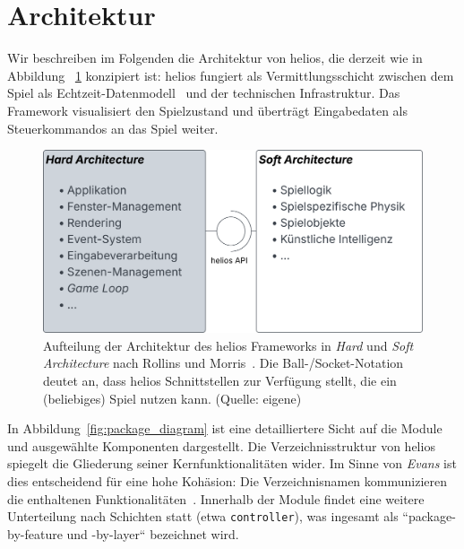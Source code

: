 \section{Architektur}
Wir beschreiben im Folgenden die Architektur von helios, die derzeit wie in Abbildung ~\ref{fig:hardarchitecture} konzipiert ist: helios fungiert als Vermittlungsschicht zwischen dem Spiel als Echtzeit-Datenmodell~\cite[525]{Gre19} und der technischen Infrastruktur.
Das Framework visualisiert den Spielzustand und überträgt Eingabedaten als Steuerkommandos an das Spiel weiter.

\begin{figure}[!h]
    \centering
    \includegraphics[width=1\columnwidth]{img/hardarchitecture.svg}
    \caption{Aufteilung der Architektur des helios Frameworks in \textit{Hard} und \textit{Soft Architecture} nach Rollins und Morris~\cite[612 ff.]{RM04}. Die Ball-/Socket-Notation deutet an, dass helios Schnittstellen zur Verfügung stellt, die ein (beliebiges) Spiel nutzen kann. (Quelle: eigene)}
    \label{fig:hardarchitecture}
\end{figure}

In Abbildung~\ref{fig:package_diagram} ist eine detailliertere Sicht auf die Module und ausgewählte Komponenten dargestellt.
Die Verzeichnisstruktur von helios spiegelt die Gliederung seiner Kernfunktionalitäten wider.
Im Sinne von \textit{Evans} ist dies entscheidend für eine hohe Kohäsion: Die Verzeichnisnamen kommunizieren die enthaltenen Funktionalitäten~\cite[180 f.]{Eva03}.
Innerhalb der Module findet eine weitere Unterteilung nach Schichten statt (etwa \texttt{controller}), was ingesamt als ``package-by-feature und -by-layer`` bezeichnet wird.


